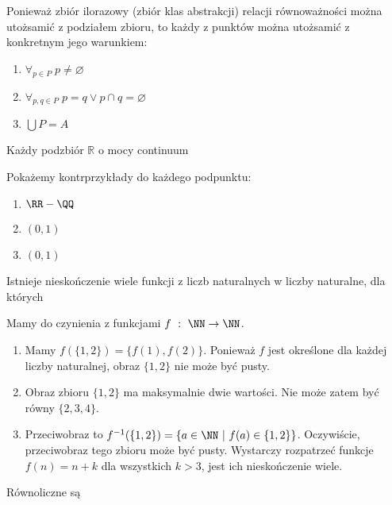 \begin{solutions}
    Ponieważ zbiór ilorazowy (zbiór klas abstrakcji) relacji równoważności można utożsamić z podziałem zbioru, to każdy z punktów można utożsamić z konkretnym jego warunkiem:
    \begin{enumerate}[\bf A.]
        \item $\forall_{p \in P} \; p \neq \varnothing$
        \item $\forall_{p, q \in P} \; p = q \lor p \cap q = \varnothing$
        \item $\bigcup P = A$
    \end{enumerate}
    
    \sol Każdy podzbiór $\mathbb{R}$ o mocy continuum

    Pokażemy kontrprzykłady do każdego podpunktu:
    \begin{enumerate}[\bf A.]
        \item $\RR - \QQ$
        \item $(0, 1)$
        \item $(0, 1)$
    \end{enumerate}

    \sol Istnieje nieskończenie wiele funkcji z liczb naturalnych w liczby naturalne, dla których
    
    Mamy do czynienia z funkcjami $f \ : \ \NN \to \NN$.
    \begin{enumerate}[\bf A.]
        \item Mamy $f(\{1,2\}) = \{ f(1), f(2)\}$. Ponieważ $f$ jest określone dla każdej liczby naturalnej, obraz $\{1,2\}$ nie może być pusty.

        \item Obraz zbioru $\{1,2\}$ ma maksymalnie dwie wartości. Nie może zatem być równy $\{2,3,4\}$.

        \item Przeciwobraz to $f^{-1}(\{1,2\}) = \{ a\in \NN \ | \ f(a)\in \{1,2\}\}$. Oczywiście, przeciwobraz tego zbioru może być pusty. Wystarczy rozpatrzeć funkcje $f(n)=n+k$ dla wszystkich $k > 3$, jest ich nieskończenie wiele.
    \end{enumerate}

    \sol Równoliczne są


\end{solutions}
